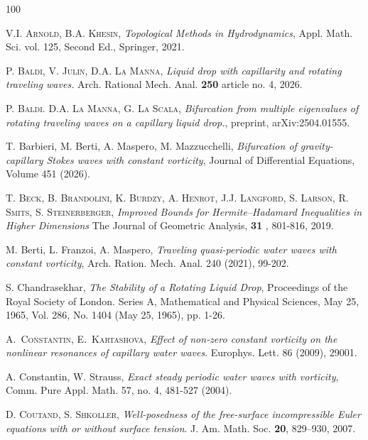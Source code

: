 \documentclass[10pt,reqno,a4paper]{article}
\numberwithin{equation}{section}
\theoremstyle{plain}
\theoremstyle{definition}
\begin{document}
 

 
\begin{thebibliography}{100}

 \textsc{V.I. Arnold, B.A. Khesin}, \emph{Topological Methods in Hydrodynamics}, Appl. Math. Sci. vol. 125, Second Ed., Springer, 2021.  

\textsc{P. Baldi, V. Julin, D.A. La Manna}, \textit{Liquid drop with capillarity and rotating traveling waves.} Arch. Rational Mech. Anal. {\bf 250} article no. 4, 2026.

\textsc{P. Baldi. D.A. La Manna, G. La Scala}, \textit{Bifurcation from multiple eigenvalues of rotating traveling waves on a capillary liquid drop.}, preprint, arXiv:2504.01555.

 {\sc T. Barbieri, M. Berti, A. Maspero, M. Mazzucchelli}, \emph{Bifurcation of gravity-capillary Stokes waves with constant vorticity}, Journal of Differential Equations, Volume 451 (2026).

\textsc{T. Beck, B. Brandolini, K. Burdzy, A. Henrot, J.J. Langford, S. Larson, R. Smits, S. Steinerberger}, \textit{Improved Bounds for Hermite–Hadamard Inequalities in Higher Dimensions} The Journal of Geometric Analysis, {\bf 31} , 801-816, 2019.

 {\sc M. Berti, L. Franzoi, A. Maspero}, 
\emph{Traveling quasi-periodic water waves with constant vorticity}, Arch. Ration. Mech. Anal. 240 (2021), 99-202.

 {\sc S. Chandrasekhar}, \emph{The Stability of a Rotating Liquid Drop}, Proceedings of the Royal Society of London. Series A, Mathematical and
Physical Sciences, May 25, 1965, Vol. 286, No. 1404 (May 25, 1965), pp. 1-26.


 \textsc{A.\ Constantin, E.\ Kartashova}, \emph{Effect of non-zero constant vorticity on the nonlinear resonances of capillary water waves}. Europhys. Lett. 86 (2009), 29001.

 {\sc A. Constantin, W. Strauss}, \emph{Exact steady periodic water waves with vorticity}, Comm. Pure Appl. Math. 57, no. 4, 481-527 (2004). 

 \textsc{D. Coutand, S. Shkoller}, {\it Well-posedness of the free-surface incompressible Euler equations with or without surface tension}. J. Am. Math. Soc. {\bf 20}, 829–930, 2007.


\end{thebibliography}
\end{document}
